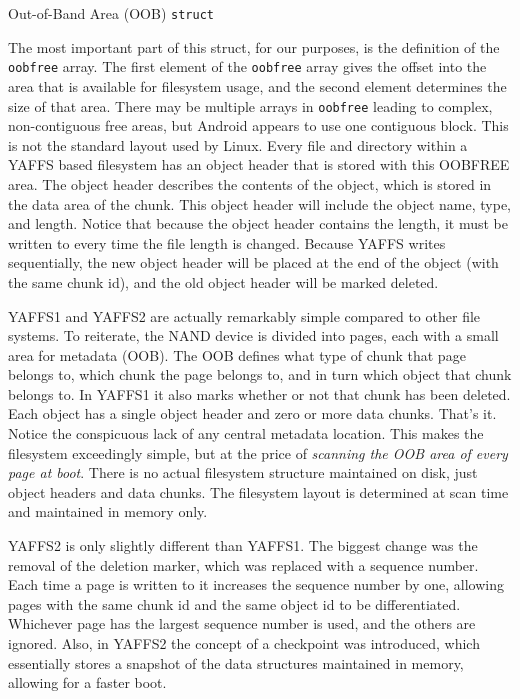 \begin{table}

\caption{Out-of-Band Area (OOB) \texttt{struct}}
\label{tab:oob}
\end{table}

The most important part of this struct, for our purposes, is the definition of the \texttt{oobfree} array.  The first element of the
\texttt{oobfree} array gives the offset into the area that is available for filesystem usage, and the second element determines the
size of that area.  There may be multiple arrays in \texttt{oobfree} leading to complex, non-contiguous free areas, but Android
appears to use one contiguous block.  This is not the standard layout used by Linux. Every file and directory within a YAFFS based
filesystem has an object header that is stored with this OOBFREE area. The object header describes the contents of the object, which
is stored in the data area of the chunk. This object header will include the object name, type, and length.  Notice that because the
object header contains the length, it must be written to every time the file length is changed.  Because YAFFS writes sequentially,
the new object header will be placed at the end of the object (with the same chunk id), and the old object header will be marked
deleted. 

YAFFS1 and YAFFS2 are actually remarkably simple compared to other file systems. To reiterate, the NAND device is divided into
pages, each with a small area for metadata (OOB).  The OOB defines what type of chunk that page belongs to, which chunk the page
belongs to, and in turn which object that chunk belongs to.  In YAFFS1 it also marks whether or not that chunk has been deleted.
Each object has a single object header and zero or more data chunks.  That's it.  Notice the conspicuous lack of any central
metadata location.  This makes the filesystem exceedingly simple, but at the price of \emph{scanning the OOB area of every page at
boot}.  There is no actual filesystem structure maintained on disk, just object headers and data chunks.  The filesystem layout is
determined at scan time and maintained in memory only. 

YAFFS2 is only slightly different than YAFFS1. The biggest change was the removal of the deletion marker, which was replaced with a
sequence number. Each time a page is written to it increases the sequence number by one, allowing pages with the same chunk id and
the same object id to be differentiated.  Whichever page has the largest sequence number is used, and the others are ignored.  Also,
in YAFFS2 the concept of a checkpoint was introduced, which essentially stores a snapshot of the data structures maintained in
memory, allowing for a faster boot.

